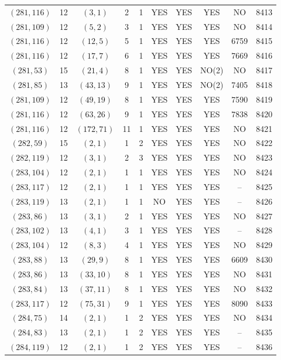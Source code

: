 \begin{longtable}{|c|c|c|c|c|c|c|c|c|c|}
$(281, 116)$ & 12 & $(3, 1)$ & 2 & 1 & YES & YES & YES & NO & 8413\\
$(281, 109)$ & 12 & $(5, 2)$ & 3 & 1 & YES & YES & YES & NO & 8414\\
$(281, 116)$ & 12 & $(12, 5)$ & 5 & 1 & YES & YES & YES & 6759 & 8415\\
$(281, 116)$ & 12 & $(17, 7)$ & 6 & 1 & YES & YES & YES & 7669 & 8416\\
$(281, 53)$ & 15 & $(21, 4)$ & 8 & 1 & YES & YES & NO(2) & NO & 8417\\
$(281, 85)$ & 13 & $(43, 13)$ & 9 & 1 & YES & YES & NO(2) & 7405 & 8418\\
$(281, 109)$ & 12 & $(49, 19)$ & 8 & 1 & YES & YES & YES & 7590 & 8419\\
$(281, 116)$ & 12 & $(63, 26)$ & 9 & 1 & YES & YES & YES & 7838 & 8420\\
$(281, 116)$ & 12 & $(172, 71)$ & 11 & 1 & YES & YES & YES & NO & 8421\\
$(282, 59)$ & 15 & $(2, 1)$ & 1 & 2 & YES & YES & YES & NO & 8422\\
$(282, 119)$ & 12 & $(3, 1)$ & 2 & 3 & YES & YES & YES & NO & 8423\\
$(283, 104)$ & 12 & $(2, 1)$ & 1 & 1 & YES & YES & YES & NO & 8424\\
$(283, 117)$ & 12 & $(2, 1)$ & 1 & 1 & YES & YES & YES & -- & 8425\\
$(283, 119)$ & 13 & $(2, 1)$ & 1 & 1 & NO & YES & YES & -- & 8426\\
$(283, 86)$ & 13 & $(3, 1)$ & 2 & 1 & YES & YES & YES & NO & 8427\\
$(283, 102)$ & 13 & $(4, 1)$ & 3 & 1 & YES & YES & YES & -- & 8428\\
$(283, 104)$ & 12 & $(8, 3)$ & 4 & 1 & YES & YES & YES & NO & 8429\\
$(283, 88)$ & 13 & $(29, 9)$ & 8 & 1 & YES & YES & YES & 6609 & 8430\\
$(283, 86)$ & 13 & $(33, 10)$ & 8 & 1 & YES & YES & YES & NO & 8431\\
$(283, 84)$ & 13 & $(37, 11)$ & 8 & 1 & YES & YES & YES & NO & 8432\\
$(283, 117)$ & 12 & $(75, 31)$ & 9 & 1 & YES & YES & YES & 8090 & 8433\\
$(284, 75)$ & 14 & $(2, 1)$ & 1 & 2 & YES & YES & YES & NO & 8434\\
$(284, 83)$ & 13 & $(2, 1)$ & 1 & 2 & YES & YES & YES & -- & 8435\\
$(284, 119)$ & 12 & $(2, 1)$ & 1 & 2 & YES & YES & YES & -- & 8436\\

\end{longtable}
